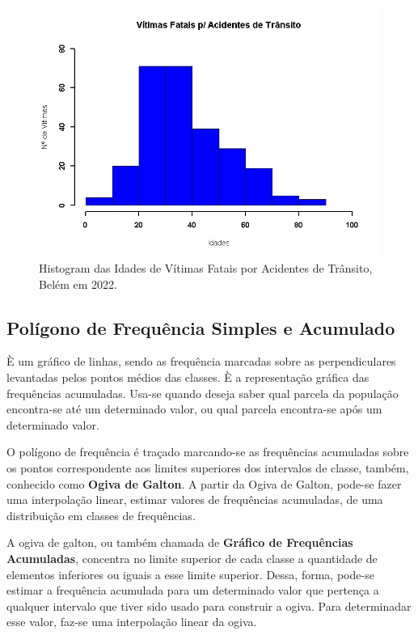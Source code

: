 \begin{figure}
    \centering
\includegraphics[scale=0.4]{figures/histograma1.jpeg}
    \caption{Histogram das Idades de Vítimas Fatais por Acidentes de Trânsito, Belém em 2022.}
    \label{fig:my_label23}
\end{figure}







\newpage
\subsection{Polígono de Frequência Simples e Acumulado}

È um gráfico de linhas, sendo as frequência marcadas sobre as
perpendiculares levantadas pelos pontos médios das classes. È a representação gráfica das frequências acumuladas. Usa-se
quando deseja saber qual parcela da população encontra-se até um
determinado valor, ou qual parcela encontra-se após um determinado
valor.\vskip0.3cm

O polígono de frequência é traçado marcando-se as frequências
acumuladas sobre os pontos correspondente aos limites superiores
dos intervalos de classe, também, conhecido como \textbf{Ogiva de
Galton}. A partir da Ogiva de Galton, pode-se fazer uma
interpolação linear, estimar valores de frequências acumuladas, de
uma distribuição em classes de frequências.\vskip0.3cm

A ogiva de galton, ou também chamada de \textbf{Gráfico de
Frequências Acumuladas}, concentra no limite superior de cada
classe a quantidade de elementos inferiores ou iguais a esse
limite superior. Dessa, forma, pode-se estimar a frequência
acumulada para um determinado valor que pertença a qualquer
intervalo que tiver sido usado para construir a ogiva. Para
determinadar esse valor, faz-se uma interpolação linear da ogiva.


